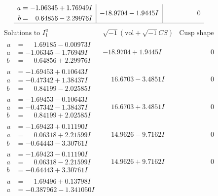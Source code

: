 \documentclass[1p]{elsarticle_modified}
\theoremstyle{definition}
\newcommand{\I}{\sqrt{-1}}
\begin{document}
$$\begin{array}{c|c|c}
\begin{aligned}
a &= -1.06345 + 1.76949 I \\
b &= \phantom{-}0.64856 - 2.29976 I\end{aligned}
 & -18.9704 - 1.9445 I & \phantom{-0.000000 } 0\\
 \hline 
 \end{array}$$\newpage$$\begin{array}{c|c|c}  
\text{Solutions to }I^u_{1}& \I (\text{vol} + \sqrt{-1}CS) & \text{Cusp shape}\\
 \hline 
\begin{aligned}
u &= \phantom{-}1.69185 - 0.00973 I \\
a &= -1.06345 - 1.76949 I \\
b &= \phantom{-}0.64856 + 2.29976 I\end{aligned}
 & -18.9704 + 1.9445 I & \phantom{-0.000000 } 0 \\ \hline\begin{aligned}
u &= -1.69453 + 0.10643 I \\
a &= -0.47342 + 1.38437 I \\
b &= \phantom{-}0.84199 - 2.02585 I\end{aligned}
 & \phantom{-}16.6703 - 3.4851 I & \phantom{-0.000000 } 0 \\ \hline\begin{aligned}
u &= -1.69453 - 0.10643 I \\
a &= -0.47342 - 1.38437 I \\
b &= \phantom{-}0.84199 + 2.02585 I\end{aligned}
 & \phantom{-}16.6703 + 3.4851 I & \phantom{-0.000000 } 0 \\ \hline\begin{aligned}
u &= -1.69423 + 0.11190 I \\
a &= \phantom{-}0.06318 + 2.21599 I \\
b &= -0.64443 - 3.30761 I\end{aligned}
 & \phantom{-}14.9626 - 9.7162 I & \phantom{-0.000000 } 0 \\ \hline\begin{aligned}
u &= -1.69423 - 0.11190 I \\
a &= \phantom{-}0.06318 - 2.21599 I \\
b &= -0.64443 + 3.30761 I\end{aligned}
 & \phantom{-}14.9626 + 9.7162 I & \phantom{-0.000000 } 0 \\ \hline\begin{aligned}
u &= \phantom{-}1.69496 + 0.13798 I \\
a &= -0.387962 - 1.341050 I \\

\end{aligned}
\end{array}$$
\end{document}
